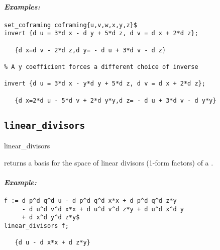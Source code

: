 \paragraph{\it Examples:}
\begin{verbatim}
set_coframing coframing{u,v,w,x,y,z}$
invert {d u = 3*d x - d y + 5*d z, d v = d x + 2*d z};

   {d x=d v - 2*d z,d y= - d u + 3*d v - d z}

% A y coefficient forces a different choice of inverse

invert {d u = 3*d x - y*d y + 5*d z, d v = d x + 2*d z};

   {d x=2*d u - 5*d v + 2*d y*y,d z= - d u + 3*d v - d y*y} 
\end{verbatim}








\subsection{\tt linear\_divisors}
\label{linear_divisors}

\begin{syntax}
	linear\_divisors 
\end{syntax}
returns a basis for the space of linear divisors (1-form factors) of a
.

\paragraph{\it Example:}
\begin{verbatim}
f := d p^d q^d u - d p^d q^d x*x + d p^d q^d z*y
     - d u^d v^d x*x + d u^d v^d z*y + d u^d x^d y
     + d x^d y^d z*y$
linear_divisors f;

   {d u - d x*x + d z*y}
\end{verbatim}

